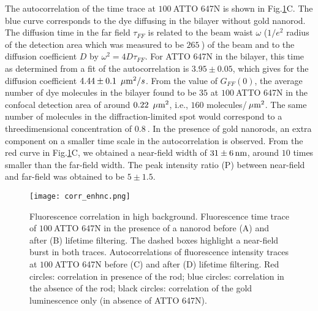 The autocorrelation of the time trace at $100~$\nM ATTO 647N is shown in Fig.\ref{fig:corr_enhnc}C. The blue curve corresponds to the dye diffusing in the bilayer without gold nanorod. The diffusion time in the far field $\tau_{FF}$ is related to the beam waist $\omega$ ($1/e^2$ radius of the detection area which was measured to be $265~$\nm) of the beam and to the diffusion coefficient $D$ by $\omega^2=4D\tau_{FF}$. For ATTO 647N in the bilayer, this time as determined from a fit of the autocorrelation is $3.95\pm0.05$\ms, which gives for the diffusion coefficient $4.44\pm0.1~\,\mu\textrm{m}^2/s$. From the value of $G_{FF}(0)$, the average number of dye molecules in the bilayer found to be $35$ at $100~$\nM ATTO 647N in the confocal detection area of around $0.22~\,\mu\textrm{m}^2$, i.e., $160$ molecules/$\,\mu\textrm{m}^2$. The same number of molecules in the diffraction-limited spot would correspond to a threedimensional concentration of $0.8~$\uM. In the presence of gold nanorods, an extra component on a smaller time scale in the autocorrelation is observed. From the red curve in Fig.\ref{fig:corr_enhnc}C, we obtained a near-field width of $31\pm6\,\textrm{nm}$, around $10$ times smaller than the far-field width. The peak intensity ratio (P) between near-field and far-field was obtained to be $5\pm1.5$.\\
\begin{figure}
	\centering
	\texttt{[image: corr\_enhnc.png]}
	\caption{Fluorescence correlation in high background. Fluorescence time trace of $100~$\nM ATTO 647N in the presence of a nanorod before (A) and after (B) lifetime filtering. The dashed boxes highlight a near-field burst in both traces. Autocorrelations of fluorescence intensity traces at $100~$\nM ATTO 647N before (C) and after (D) lifetime filtering. Red circles: correlation in presence of the rod; blue circles: correlation in the absence of the rod; black circles: correlation of the gold luminescence only (in absence of ATTO 647N).}
	\label{fig:corr_enhnc}
\end{figure}
